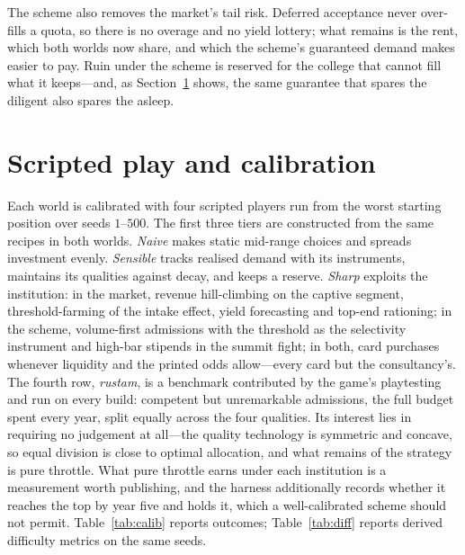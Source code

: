 \documentclass[11pt,a4paper]{article}
\begin{document}
The scheme also removes the market's tail risk. Deferred acceptance never over-fills a quota, so there is no overage and no yield lottery; what remains is the rent, which both worlds now share, and which the scheme's guaranteed demand makes easier to pay. Ruin under the scheme is reserved for the college that cannot fill what it keeps---and, as Section~\ref{sec:calib} shows, the same guarantee that spares the diligent also spares the asleep.

\section{Scripted play and calibration}\label{sec:calib}

Each world is calibrated with four scripted players run from the worst starting position over seeds $1$--$500$. The first three tiers are constructed from the same recipes in both worlds. \emph{Naive} makes static mid-range choices and spreads investment evenly. \emph{Sensible} tracks realised demand with its instruments, maintains its qualities against decay, and keeps a reserve. \emph{Sharp} exploits the institution: in the market, revenue hill-climbing on the captive segment, threshold-farming of the intake effect, yield forecasting and top-end rationing; in the scheme, volume-first admissions with the threshold as the selectivity instrument and high-bar stipends in the summit fight; in both, card purchases whenever liquidity and the printed odds allow---every card but the consultancy's. The fourth row, \emph{rustam}, is a benchmark contributed by the game's playtesting and run on every build: competent but unremarkable admissions, the full budget spent every year, split equally across the four qualities. Its interest lies in requiring no judgement at all---the quality technology is symmetric and concave, so equal division is close to optimal allocation, and what remains of the strategy is pure throttle. What pure throttle earns under each institution is a measurement worth publishing, and the harness additionally records whether it reaches the top by year five and holds it, which a well-calibrated scheme should not permit. Table~\ref{tab:calib} reports outcomes; Table~\ref{tab:diff} reports derived difficulty metrics on the same seeds.
\end{document}
